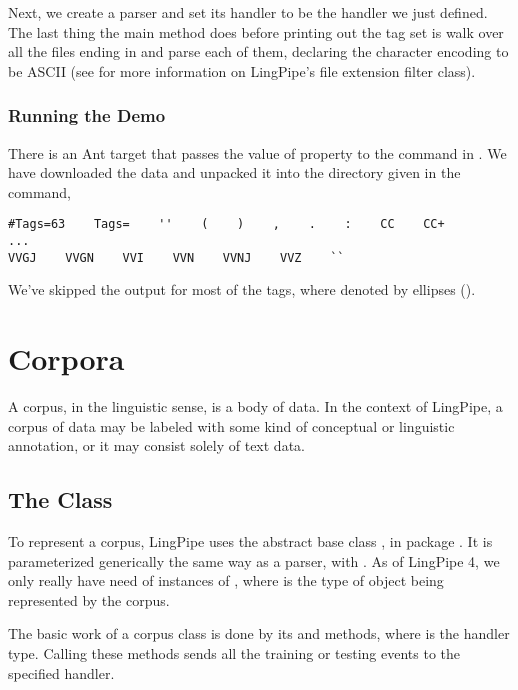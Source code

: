 Next, we create a parser and set its handler to be the
handler we just defined.
%
%
The last thing the main method does before printing out the tag set is
walk over all the files ending in  and parse each of them,
declaring the character encoding to be ASCII (see
 for more information on LingPipe's
file extension filter class).

\subsubsection{Running the Demo}

There is an Ant target  that passes
the value of property  to the command
in .  We have downloaded the data
and unpacked it into the directory given in the command,
%
\begin{verbatim}
#Tags=63    Tags=    ''    (    )    ,    .    :    CC    CC+
... 
VVGJ    VVGN    VVI    VVN    VVNJ    VVZ    ``
\end{verbatim}
%
We've skipped the output for most of the tags, where denoted by
ellipses ().


\section{Corpora}

A corpus, in the linguistic sense, is a body of data.  In the context
of LingPipe, a corpus of data may be labeled with some kind of
conceptual or linguistic annotation, or it may consist solely of text
data.

\subsection{The  Class}

To represent a corpus, LingPipe uses the abstract base class
, in package .  It is
parameterized generically the same way as a parser, with
.  As of LingPipe 4, we only really
have need of instances of , where
 is the type of object being represented by the corpus.

The basic work of a corpus class is done by its 
and  methods, where  is the handler type.
Calling these methods sends all the training or testing events to the
specified handler.  

